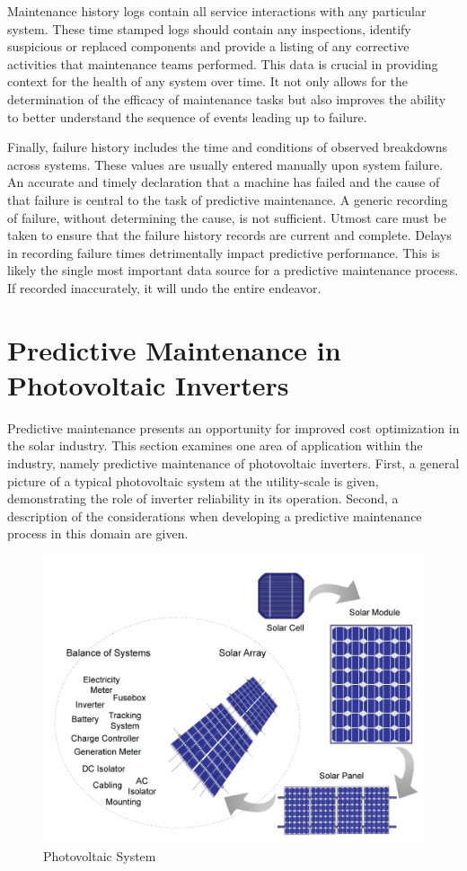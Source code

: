 Maintenance history logs contain all service interactions with any particular system. These time stamped logs should contain any inspections, identify suspicious or replaced components and provide a listing of any corrective activities that maintenance teams performed. This data is crucial in providing context for the health of any system over time. It not only allows for the determination of the efficacy of maintenance tasks but also improves the ability to better understand the sequence of events leading up to failure.

Finally, failure history includes the time and conditions of observed breakdowns across systems. These values are usually entered manually upon system failure. An accurate and timely declaration that a machine has failed and the cause of that failure is central to the task of predictive maintenance. A generic recording of failure, without determining the cause, is not sufficient. Utmost care must be taken to ensure that the failure history records are current and complete. Delays in recording failure times detrimentally impact predictive performance. This is likely the single most important data source for a predictive maintenance process. If recorded inaccurately, it will undo the entire endeavor. 

\section{Predictive Maintenance in Photovoltaic Inverters}

Predictive maintenance presents an opportunity for improved cost optimization in the solar industry. This section examines one area of application within the industry, namely predictive maintenance of photovoltaic inverters. First, a general picture of a typical photovoltaic system at the utility-scale is given, demonstrating the role of inverter reliability in its operation. Second, a description of the considerations when developing a predictive maintenance process in this domain are given. 


\begin{figure}[ht!]
\centering
\includegraphics[width=350pt]{img/photovoltaic_system.png}
\caption{Photovoltaic System}
\label{pv_system}
\end{figure}

